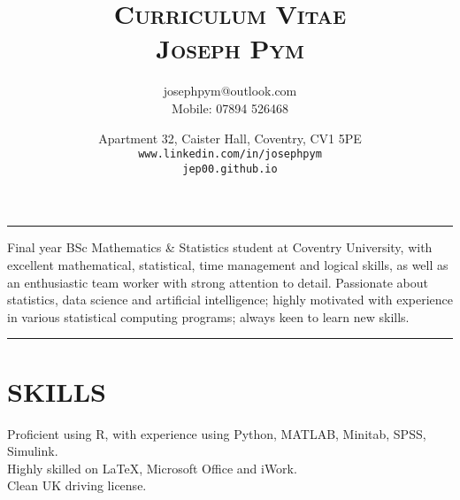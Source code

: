 \documentclass[9pt,a4paper]{article}
\title{\scshape{Curriculum Vitae}\\Joseph Pym}\author{josephpym@outlook.com\\Mobile: 07894 526468}\date{Apartment 32, Caister Hall, Coventry, CV1 5PE\\\texttt{www.linkedin.com/in/josephpym} \\ \texttt{jep00.github.io}}
\begin{document}
\maketitle\setcounter{secnumdepth}{0}
\begin{center}\rule{0.5\textwidth}{0.3pt}\end{center}
\begin{center} %
\noindent Final year BSc Mathematics \& Statistics student at Coventry University, with excellent mathematical, statistical, time management and logical skills, as well as an enthusiastic team worker with strong attention to detail. Passionate about statistics, data science and artificial intelligence; highly motivated with experience in various statistical computing programs; always keen to learn new skills.\end{center}
\begin{center}\rule{0.5\textwidth}{0.3pt}\end{center}

\section{SKILLS}
\noindent Proficient using R, with experience using Python, MATLAB, Minitab, SPSS, Simulink.\\
Highly skilled on \LaTeX, Microsoft Office and iWork.\\
Clean UK driving license.
\end{document}

